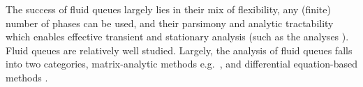 The success of fluid queues largely lies in their mix of flexibility, any (finite) number of phases can be used, and their parsimony and analytic tractability which enables effective transient and stationary analysis (such as the analyses \cite{ajr2005,ar2003,ar2004,bean2005b,bean2005,bot08,bean2009,dasilva2005,latouche2018,bnp2018}). Fluid queues are relatively well studied. Largely, the analysis of fluid queues falls into two categories, matrix-analytic methods e.g.~\cite{ajr2005,ar2003,ar2004,bean2005b,bean2005,bot08,bean2009,dasilva2005,latouche2018}, and differential equation-based methods \cite{anick1982,kk1995,blnos2022}. %


